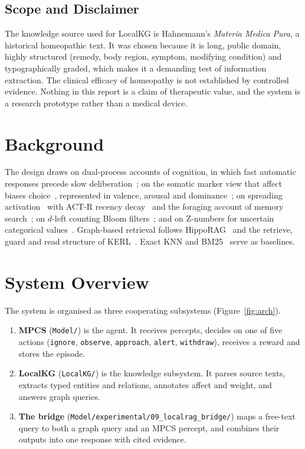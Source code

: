 \documentclass[12pt,a4paper,oneside]{report}
\newcommand{\code}[1]{\texttt{\small #1}}
\begin{document}
\section{Scope and Disclaimer}
The knowledge source used for LocalKG is Hahnemann's \emph{Materia Medica Pura}, a historical homeopathic text. It was chosen because it is long, public domain, highly structured (remedy, body region, symptom, modifying condition) and typographically graded, which makes it a demanding test of information extraction. The clinical efficacy of homeopathy is not established by controlled evidence. Nothing in this report is a claim of therapeutic value, and the system is a research prototype rather than a medical device.

\chapter{Background}\label{ch:background}
The design draws on dual-process accounts of cognition, in which fast automatic responses precede slow deliberation~\cite{kahneman2011}; on the somatic marker view that affect biases choice~\cite{damasio1994}, represented in valence, arousal and dominance~\cite{mehrabian1996}; on spreading activation~\cite{collins1975} with ACT-R recency decay~\cite{anderson2004} and the foraging account of memory search~\cite{hills2012}; on $d$-left counting Bloom filters~\cite{bonomi2006}; and on Z-numbers for uncertain categorical values~\cite{zadeh2011}. Graph-based retrieval follows HippoRAG~\cite{gutierrez2024} and the retrieve, guard and read structure of KERL~\cite{mohbat2025}. Exact KNN and BM25~\cite{robertson2009} serve as baselines.

\chapter{System Overview}\label{ch:overview}
The system is organised as three cooperating subsystems (Figure~\ref{fig:arch}).

\begin{enumerate}
  \item \textbf{MPCS} (\code{Model/}) is the agent. It receives percepts, decides on one of five actions (\code{ignore}, \code{observe}, \code{approach}, \code{alert}, \code{withdraw}), receives a reward and stores the episode.
  \item \textbf{LocalKG} (\code{LocalKG/}) is the knowledge subsystem. It parses source texts, extracts typed entities and relations, annotates affect and weight, and answers graph queries.
  \item \textbf{The bridge} (\code{Model/experimental/09\_localrag\_bridge/}) maps a free-text query to both a graph query and an MPCS percept, and combines their outputs into one response with cited evidence.
\end{enumerate}
\end{document}
